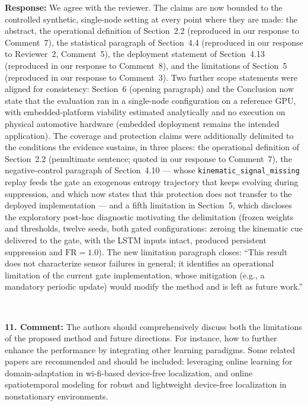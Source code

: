 \documentclass[1p,12pt,authoryear]{elsarticle}
\providecommand{\revcolor}{black}%
\begin{document}
\vspace{2mm}
\noindent \textbf{Response:} We agree with the reviewer. The claims are now bounded to the controlled synthetic, single-node setting at every point where they are made: the abstract, the operational definition of Section~2.2 (reproduced in our response to Comment~7), the statistical paragraph of Section~4.4 (reproduced in our response to Reviewer~2, Comment~5), the deployment statement of Section~4.13 (reproduced in our response to Comment~8), and the limitations of Section~5 (reproduced in our response to Comment~3). {\color{\revcolor}Two further scope statements were aligned for consistency: Section~6 (opening paragraph) and the Conclusion now state that the evaluation ran in a single-node configuration on a reference GPU, with embedded-platform viability estimated analytically and no execution on physical automotive hardware (embedded deployment remains the intended application). The coverage and protection claims were additionally delimited to the conditions the evidence sustains, in three places: the operational definition of Section~2.2 (penultimate sentence; quoted in our response to Comment~7), the negative-control paragraph of Section~4.10 --- whose \texttt{kinematic\_signal\_missing} replay feeds the gate an exogenous entropy trajectory that keeps evolving during suppression, and which now states that this protection does not transfer to the deployed implementation --- and a fifth limitation in Section~5, which discloses the exploratory post-hoc diagnostic motivating the delimitation (frozen weights and thresholds, twelve seeds, both gated configurations: zeroing the kinematic cue delivered to the gate, with the LSTM inputs intact, produced persistent suppression and $\mathrm{FR}=1.0$). The new limitation paragraph closes: ``This result does not characterize sensor failures in general; it identifies an operational limitation of the current gate implementation, whose mitigation (e.g., a mandatory periodic update) would modify the method and is left as future work.''}

~

\noindent \textbf{11. Comment:} The authors should comprehensively discuss both the limitations of the proposed method and future directions. For instance, how to further enhance the performance by integrating other learning paradigms. Some related papers are recommended and should be included: leveraging online learning for domain-adaptation in wi-fi-based device-free localization, and online spatiotemporal modeling for robust and lightweight device-free localization in nonstationary environments.
\end{document}
